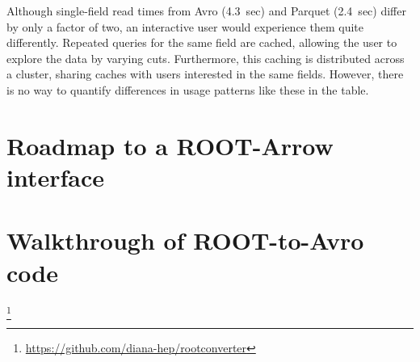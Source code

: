 \documentclass{article}
\begin{document}
Although single-field read times from Avro (4.3~sec) and Parquet (2.4~sec) differ by only a factor of two, an interactive user would experience them quite differently. Repeated queries for the same field are cached, allowing the user to explore the data by varying cuts. Furthermore, this caching is distributed across a cluster, sharing caches with users interested in the same fields. However, there is no way to quantify differences in usage patterns like these in the table.

\section*{Roadmap to a ROOT-Arrow interface}







\section*{Walkthrough of ROOT-to-Avro code}

\footnote{\url{https://github.com/diana-hep/rootconverter}}
\end{document}

